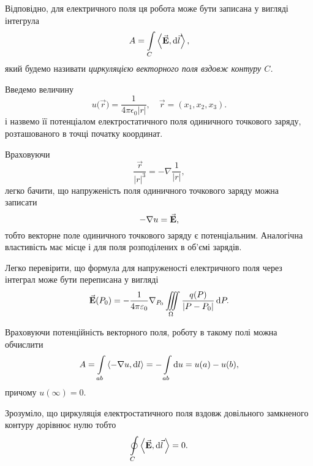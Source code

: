 \begin{definition}
	Відповідно, для електричного поля ця робота може бути записана у вигляді інтегрула
	\begin{equation}
		A = \Int_C \langle \vecf E, \diff \vec l\rangle,
	\end{equation} 
	який будемо називати \it{циркуляцією векторного поля} вздовж контуру $C$.
\end{definition}

\begin{definition}
	Введемо величину
	\begin{equation}
		u\Big(\vec r\Big) = \frac{1}{4 \pi \epsilon_0 |r|}, \quad \vec r = (x_1, x_2, x_3).
	\end{equation}
	і назвемо її потенціалом електростатичного поля одиничного точкового заряду, розташованого в точці початку координат.
\end{definition}

Враховуючи 
\begin{equation}
	\frac{\vec r}{|r|^3} = - \nabla \frac{1}{|r|},
\end{equation}
легко бачити, що напруженість поля одиничного точкового заряду можна записати 
\begin{equation}
	-\nabla u = {\vec{\mathbf{E}}},
\end{equation}
тобто векторне поле одиничного точкового заряду є потенціальним. Аналогічна властивість має місце і для поля розподілених в об'ємі зарядів. \medskip


Легко перевірити, що формула для напруженості електричного поля через інтеграл може бути переписана у вигляді
\begin{equation}
	{\vec{\mathbf{E}}} (P_0) = - \frac{1}{4 \pi \varepsilon_0} \nabla_{P_0} \displaystyle\iiint\limits_\Omega \frac{q(P)}{|P-P_0|} \mathop{}\!\mathrm{d} P.
\end{equation}

Враховуючи потенційність векторного поля, роботу в такому полі можна обчислити
\begin{equation}
	A = \Int_{ab} \langle - \nabla u, \diff l \rangle = - \Int_{ab} \diff u = u(a) - u(b),
\end{equation}
причому $u(\infty) = 0$. \medskip

\begin{remark}
	Зрозуміло, що циркуляція електростатичного поля вздовж довільного замкненого контуру дорівнює нулю тобто
	\begin{equation}
		\Oint_C \langle \vecf E, \diff \vec l \, \rangle = 0.
	\end{equation}
\end{remark}

